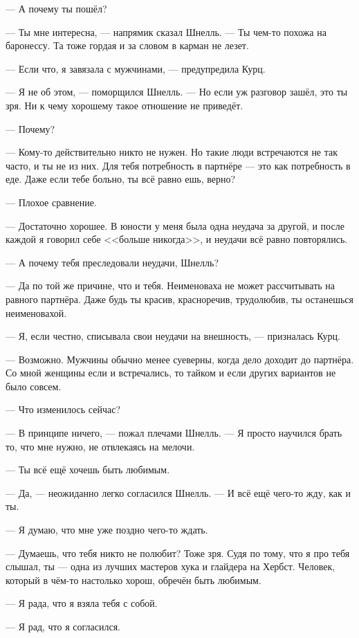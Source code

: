 \documentclass[a4paper,10pt,fleqn]{book}\usepackage{polyglossia}\setdefaultlanguage{english}\setotherlanguage{russian}\defaultfontfeatures{Ligatures=TeX,Mapping=tex-text}\usepackage{xcolor}\definecolor{lightgray}{HTML}{bbbbbb}\color{lightgray}\newcommand{\ml}[3]{\textcolor{black}{#3}}
\begin{document}
--- А почему ты пошёл?

--- Ты мне интересна, --- напрямик сказал Шнелль.
--- Ты чем-то похожа на баронессу.
Та тоже гордая и за словом в карман не лезет.

--- Если что, я завязала с мужчинами, --- предупредила Курц.

--- Я не об этом, --- поморщился Шнелль.
--- Но если уж разговор зашёл, это ты зря.
Ни к чему хорошему такое отношение не приведёт.

--- Почему?

--- Кому-то действительно никто не нужен.
Но такие люди встречаются не так часто, и ты не из них.
Для тебя потребность в партнёре --- это как потребность в еде.
Даже если тебе больно, ты всё равно ешь, верно?

--- Плохое сравнение.

--- Достаточно хорошее.
В юности у меня была одна неудача за другой, и после каждой я говорил себе <<больше никогда>>, и неудачи всё равно повторялись.

--- А почему тебя преследовали неудачи, Шнелль?

--- Да по той же причине, что и тебя.
Неименоваха не может рассчитывать на равного партнёра.
Даже будь ты красив, красноречив, трудолюбив, ты останешься неименовахой.

--- Я, если честно, списывала свои неудачи на внешность, --- призналась Курц.

--- Возможно.
Мужчины обычно менее суеверны, когда дело доходит до партнёра.
Со мной женщины если и встречались, то тайком и если других вариантов не было совсем.

--- Что изменилось сейчас?

--- В принципе ничего, --- пожал плечами Шнелль.
--- Я просто научился брать то, что мне нужно, не отвлекаясь на мелочи.

--- Ты всё ещё хочешь быть любимым.

--- Да, --- неожиданно легко согласился Шнелль.
--- И всё ещё чего-то жду, как и ты.

--- Я думаю, что мне уже поздно чего-то ждать.

--- Думаешь, что тебя никто не полюбит?
Тоже зря.
Судя по тому, что я про тебя слышал, ты --- одна из лучших мастеров хука и глайдера на Хербст.
Человек, который в чём-то настолько хорош, обречён быть любимым.

--- Я рада, что я взяла тебя с собой.

--- Я рад, что я согласился.
\end{document}
